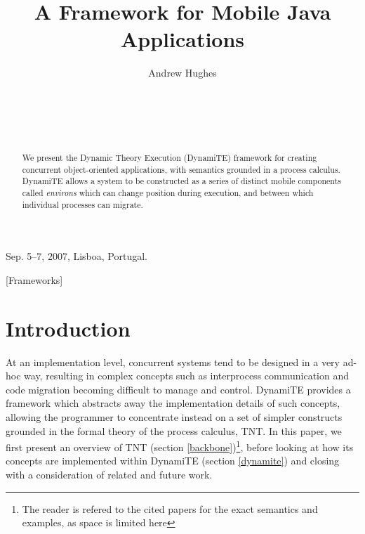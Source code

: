 \documentclass{sig-alternate}
\begin{document}
 {Sep. 5--7, 2007, Lisboa,
Portugal.}

\title{A Framework for Mobile Java Applications}
\author{
\alignauthor
Andrew Hughes\\
       \\
       \\
       \\
       \\
}
\maketitle

\begin{abstract}
We present the Dynamic Theory Execution (DynamiTE) framework for
 creating concurrent object-oriented applications, with semantics
 grounded in a process calculus.  DynamiTE allows a system to be
 constructed as a series of distinct mobile components called
 \emph{environs} which can change position during execution, and between
 which individual processes can migrate.
\end{abstract}

[Frameworks]



\section{Introduction}

At an implementation level, concurrent systems tend to be designed in a
very ad-hoc way, resulting in complex concepts such as interprocess
communication and code migration becoming difficult to manage and
control.  DynamiTE provides a framework which abstracts away the
implementation details of such concepts, allowing the programmer to
concentrate instead on a set of simpler constructs grounded in the
formal theory of the process calculus, TNT.  In this paper, we first
present an overview of TNT (section \ref{backbone})\footnote{The reader
is refered to the cited papers for the exact semantics and examples, as
space is limited here}, before looking at how its concepts are
implemented within DynamiTE (section \ref{dynamite}) and closing with a
consideration of related and future work.
 
\end{document}
